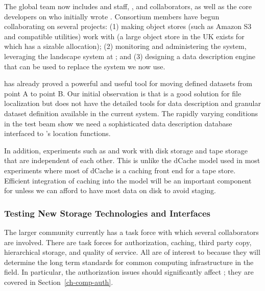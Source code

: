 The global  team now includes  and  staff, , and  collaborators, as well as the core developers on  who initially wrote .  Consortium members have begun collaborating on several projects:  (1) making object stores (such as Amazon S3 and compatible utilities) work with  (a large object store in the UK exists for which  has a sizable allocation);  (2) monitoring  and administering the  system, leveraging the landscape system at ; and  (3) designing a  data description engine that can be used to replace the  system we now use.



 has already proved a powerful and useful tool for moving defined datasets from point A to point B.  Our initial observation is that  is a good solution for file localization but does not have the detailed tools for data description and granular dataset definition available in the current  system.  The rapidly varying conditions in the test beam show we need a sophisticated data description database interfaced to 's location functions. 

In addition,  experiments such as  and  work with disk storage and tape storage that are independent of each other.  This is unlike the dCache model used in most  experiments where most of dCache is a caching front end for a tape store.  Efficient integration of caching into the  model will be an important component for  unless we can afford to have most data on disk to avoid staging.



\subsubsection{Testing New Storage Technologies and Interfaces}

The larger  community\cite{Berzano:2018xaa} currently has a  task force
 with which several  collaborators are involved. There are task forces for authorization, caching, third party copy, hierarchical storage, and quality of service. All are of interest to  because they will determine the long term standards for common computing infrastructure in the field. 
In particular, the authorization issues should significantly affect ; they are covered in Section~\ref{ch-comp-auth}.


